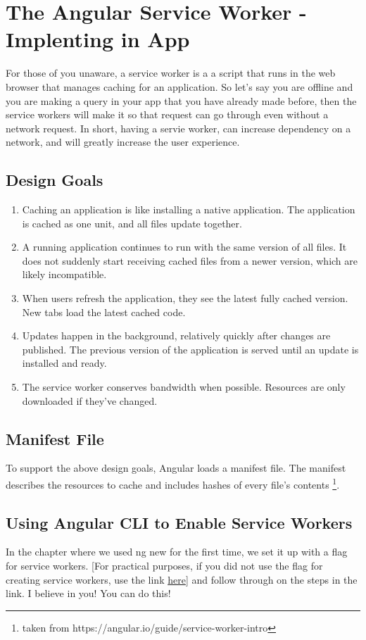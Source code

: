 
\chapter{ The Angular Service Worker - Implenting in App }

For those of you unaware, a service worker is a a script that runs in the web
browser that manages caching for an application. So let's say you are offline
and you are making a query in your app that you have already made before, then
the service workers will make it so that request can go through even without a
network request. In short, having a servie worker, can increase dependency on a
network, and will greatly increase the user experience.

\section{ Design Goals }
\begin{enumerate}
  \item Caching an application is like installing a native application.
  The application is cached as one unit, and all files update together.
  \item A running application continues to run with the same version of all
  files. It does not suddenly start receiving cached files from a newer version,
  which are likely incompatible.
  \item When users refresh the application, they see the latest fully cached
  version. New tabs load the latest cached code.
  \item Updates happen in the background, relatively quickly after changes are
  published. The previous version of the application is served until an update
  is installed and ready.
  \item The service worker conserves bandwidth when possible. Resources are only
  downloaded if they've changed.
\end{enumerate}

\section{ Manifest File }
To support the above design goals, Angular loads a manifest file. The manifest
describes the resources to cache and includes hashes of every file's contents
\footnote{taken from https://angular.io/guide/service-worker-intro}.

\section{ Using Angular CLI to Enable Service Workers }
In the chapter where we used ng new for the first time, we set it up with a flag
for service workers. [For practical purposes, if you did not use the flag for
creating service workers, use the link \href{https://angular.io/guide/service-worker-getting-started}{here}]
and follow through on the steps in the link. I believe in you! You can do this!

